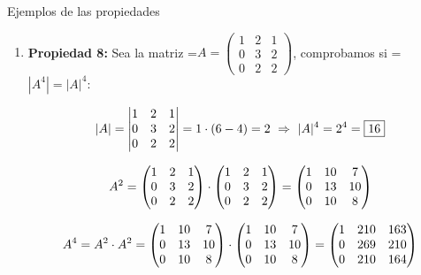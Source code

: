 \documentclass[11pt,a4paper]{article}
\newcommand{\fmm}[1]{\setbox0=\hbox{$#1$}\ifdim\wd0>\linewidth\fmdisp{#1}\else\mbox{\box0}\fi}
\newcommand{\fmdisp}[1]{\[\setbox2=\hbox{$\displaystyle #1$}\ifdim\wd2>\linewidth\resizebox{\linewidth}{!}{\box2}\else\box2\fi\]}
\begin{document}
\begin{fmex}{Ejemplos de las propiedades}
\begin{enumerate}[label=\textbf{\arabic*.},leftmargin=*]
\fmdisp{\begin{vmatrix}a+1 & a+2 & a+3\\ 1 & 2 & 2\\ 4 & 3 & 4\end{vmatrix}=\begin{vmatrix}a & a & a\\ 1 & 2 & 2\\ 4 & 3 & 4\end{vmatrix}+\begin{vmatrix}1 & 2 & 3\\ 1 & 2 & 2\\ 4 & 3 & 4\end{vmatrix}=}

\fmdisp{=[8a+3a+8a-(8a+6a+4a)]+[8+9+16-(24+6+8)]=\boxed{a-5}}

\item \textbf{Propiedad 8:} Sea la matriz \fmm{A=\begin{pmatrix}1 & 2 & 1\\ 0 & 3 & 2\\ 0 & 2 & 2\end{pmatrix}}, comprobamos si \fmm{|A^4|=|A|^4}:

\fmdisp{|A|=\begin{vmatrix}1 & 2 & 1\\ 0 & 3 & 2\\ 0 & 2 & 2\end{vmatrix}=1\cdot(6-4)=2\ \Rightarrow\ |A|^4=2^4=\boxed{16}}

\fmdisp{A^2=\begin{pmatrix}1 & 2 & 1\\ 0 & 3 & 2\\ 0 & 2 & 2\end{pmatrix}\cdot\begin{pmatrix}1 & 2 & 1\\ 0 & 3 & 2\\ 0 & 2 & 2\end{pmatrix}=\begin{pmatrix}1 & 10 & 7\\ 0 & 13 & 10\\ 0 & 10 & 8\end{pmatrix}}

\fmdisp{A^4=A^2\cdot A^2=\begin{pmatrix}1 & 10 & 7\\ 0 & 13 & 10\\ 0 & 10 & 8\end{pmatrix}\cdot\begin{pmatrix}1 & 10 & 7\\ 0 & 13 & 10\\ 0 & 10 & 8\end{pmatrix}=\begin{pmatrix}1 & 210 & 163\\ 0 & 269 & 210\\ 0 & 210 & 164\end{pmatrix}}


\end{enumerate}
\end{fmex}
\end{document}

